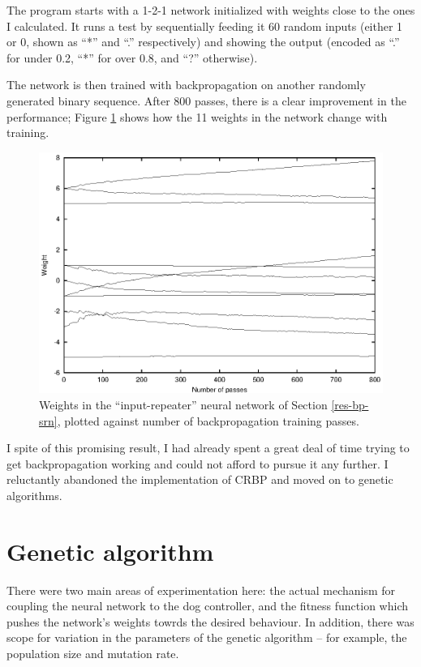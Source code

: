 \documentclass[a4paper]{report}
\begin{document}
The program starts with a 1-2-1 network initialized with weights close
to the ones I calculated. It runs a test by sequentially feeding it 60
random inputs (either 1 or 0, shown as ``*'' and ``.'' respectively)
and showing the output (encoded as ``.'' for under 0.2, ``*'' for over
0.8, and ``?'' otherwise).

The network is then trained with backpropagation on another randomly
generated binary sequence. After 800 passes, there is a clear
improvement in the performance; Figure \ref{fig-bptrain} shows how the
11 weights in the network change with training.

\begin{figure}[htb]
  \centerline{\includegraphics{figs/pgraph2.eps}}
  \caption{ \label{fig-bptrain} Weights in the ``input-repeater''
    neural network of Section \ref{res-bp-srn}, plotted against number
    of backpropagation training passes.}
\end{figure}


I spite of this promising result, I had already spent a great deal of
time trying to get backpropagation working and could not afford to
pursue it any further.  I reluctantly abandoned the implementation of
CRBP and moved on to genetic algorithms.

\section{Genetic algorithm}
\label{res-ga}

There were two main areas of experimentation here: the actual
mechanism for coupling the neural network to the dog controller, and
the fitness function which pushes the network's weights towrds the
desired behaviour. In addition, there was scope for variation in the
parameters of the genetic algorithm -- for example, the population
size and mutation rate.
\end{document}
